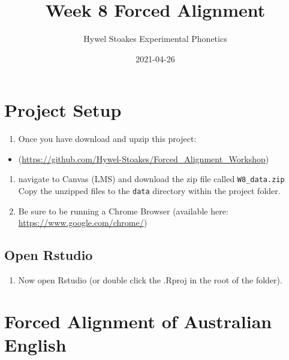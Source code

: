 \documentclass[
  11pt,
]{article}
\title{Week 8 Forced Alignment}
\author{Hywel Stoakes \textbar{} Experimental Phonetics}
\date{2021-04-26}
\providecommand{\tightlist}{%
  \setlength{\itemsep}{0pt}\setlength{\parskip}{0pt}}
\begin{document}
\maketitle

{
\hypersetup{linkcolor=}
\setcounter{tocdepth}{2}
\tableofcontents
}
\hypertarget{project-setup}{%
\section{Project Setup}\label{project-setup}}

\begin{enumerate}
\def\labelenumi{\arabic{enumi}.}
\tightlist
\item
  Once you have download and upzip this project:
\end{enumerate}

\begin{itemize}
\tightlist
\item
  (\url{https://github.com/Hywel-Stoakes/Forced_Alignment_Workshop})
\end{itemize}

\begin{enumerate}
\def\labelenumi{\arabic{enumi}.}
\setcounter{enumi}{1}
\item
  navigate to Canvas (LMS) and download the zip file called
  \texttt{W8\_data.zip} Copy the unzipped files to the \texttt{data}
  directory within the project folder.
\item
  Be sure to be running a Chrome Browser (available here:
  \url{https://www.google.com/chrome/})
\end{enumerate}

\hypertarget{open-rstudio}{%
\subsection{Open Rstudio}\label{open-rstudio}}

\begin{enumerate}
\def\labelenumi{\arabic{enumi}.}
\setcounter{enumi}{3}
\tightlist
\item
  Now open Rstudio (or double click the .Rproj in the root of the
  folder).
\end{enumerate}

\hypertarget{forced-alignment-of-australian-english}{%
\section{Forced Alignment of Australian
English}\label{forced-alignment-of-australian-english}}
\end{document}

